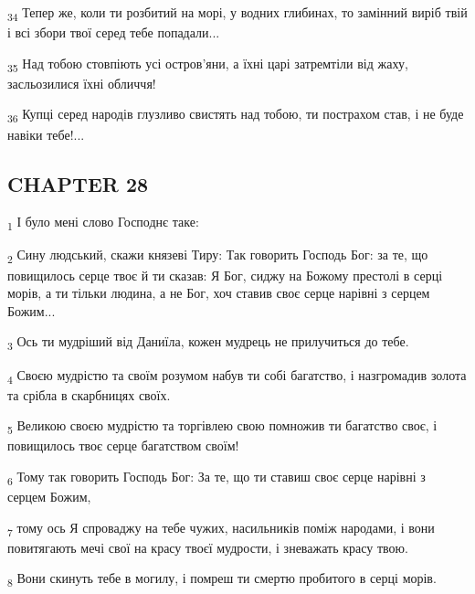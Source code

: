 \begin{tcolorbox}
\textsubscript{34} Тепер же, коли ти розбитий на морі, у водних глибинах, то замінний виріб твій і всі збори твої серед тебе попадали...
\end{tcolorbox}
\begin{tcolorbox}
\textsubscript{35} Над тобою стовпіють усі остров'яни, а їхні царі затремтіли від жаху, засльозилися їхні обличчя!
\end{tcolorbox}
\begin{tcolorbox}
\textsubscript{36} Купці серед народів глузливо свистять над тобою, ти пострахом став, і не буде навіки тебе!...
\end{tcolorbox}
\subsection{CHAPTER 28}
\begin{tcolorbox}
\textsubscript{1} І було мені слово Господнє таке:
\end{tcolorbox}
\begin{tcolorbox}
\textsubscript{2} Сину людський, скажи князеві Тиру: Так говорить Господь Бог: за те, що повищилось серце твоє й ти сказав: Я Бог, сиджу на Божому престолі в серці морів, а ти тільки людина, а не Бог, хоч ставив своє серце нарівні з серцем Божим...
\end{tcolorbox}
\begin{tcolorbox}
\textsubscript{3} Ось ти мудріший від Даниїла, кожен мудрець не прилучиться до тебе.
\end{tcolorbox}
\begin{tcolorbox}
\textsubscript{4} Своєю мудрістю та своїм розумом набув ти собі багатство, і назгромадив золота та срібла в скарбницях своїх.
\end{tcolorbox}
\begin{tcolorbox}
\textsubscript{5} Великою своєю мудрістю та торгівлею свою помножив ти багатство своє, і повищилось твоє серце багатством своїм!
\end{tcolorbox}
\begin{tcolorbox}
\textsubscript{6} Тому так говорить Господь Бог: За те, що ти ставиш своє серце нарівні з серцем Божим,
\end{tcolorbox}
\begin{tcolorbox}
\textsubscript{7} тому ось Я спроваджу на тебе чужих, насильників поміж народами, і вони повитягають мечі свої на красу твоєї мудрости, і зневажать красу твою.
\end{tcolorbox}
\begin{tcolorbox}
\textsubscript{8} Вони скинуть тебе в могилу, і помреш ти смертю пробитого в серці морів.
\end{tcolorbox}

